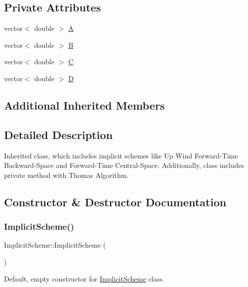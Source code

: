 \subsection*{Private Attributes}
\begin{DoxyCompactItemize}
\item 
vector$<$ double $>$ \mbox{\hyperlink{class_implicit_scheme_a9bd3d0a458683f9a17e8d11016c9f879}{A}}
\item 
vector$<$ double $>$ \mbox{\hyperlink{class_implicit_scheme_affeedb3fe9f7ebb8be113c884dd09a97}{B}}
\item 
vector$<$ double $>$ \mbox{\hyperlink{class_implicit_scheme_ab9059b52250e0afdd41b855299e6cf71}{C}}
\item 
vector$<$ double $>$ \mbox{\hyperlink{class_implicit_scheme_a30dad74ec599966b5ba7965f382d28cb}{D}}
\end{DoxyCompactItemize}
\subsection*{Additional Inherited Members}


\subsection{Detailed Description}
Inherited class, which includes implicit schemes like Up Wind Forward-\/\+Time Backward-\/\+Space and Forward-\/\+Time Central-\/\+Space. Additionally, class includes private method with Thomas Algorithm. 

\subsection{Constructor \& Destructor Documentation}
\mbox{\label{class_implicit_scheme_a7bb3a64ab8d7ca0b58ed4ba9817b8c12}} 
\subsubsection{\texorpdfstring{Implicit\+Scheme()}{ImplicitScheme()}}
{\footnotesize\ttfamily Implicit\+Scheme\+::\+Implicit\+Scheme (\begin{DoxyParamCaption}{ }\end{DoxyParamCaption})}

Default, empty constructor for \mbox{\hyperlink{class_implicit_scheme}{Implicit\+Scheme}} class. \mbox{\label{class_implicit_scheme_aca61347d2335e248678f7f3060785762}} 
